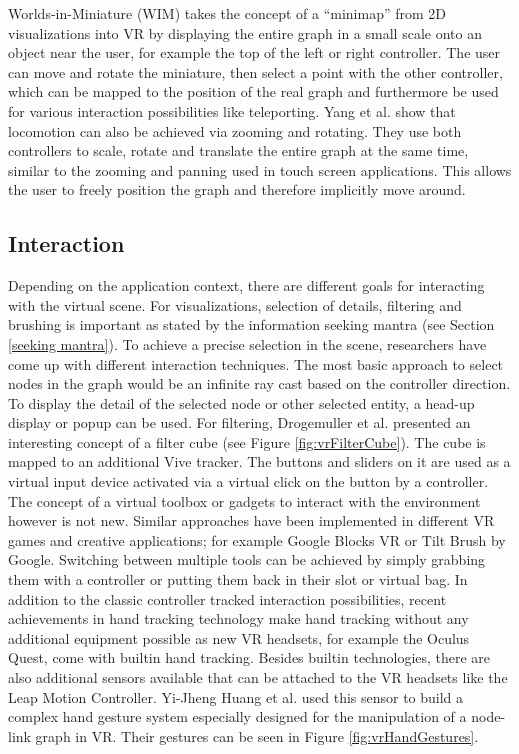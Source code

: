 Worlds-in-Miniature (WIM) \cite{drogemuller_examining_2020} takes the concept of a “minimap” from 2D visualizations into VR by displaying the entire graph in a small scale onto an object near the user, for example the top of the left or right controller. The user can move and rotate the miniature, then select a point with the other controller, which can be mapped to the position of the real graph and furthermore be used for various interaction possibilities like teleporting. Yang et al. \cite{yang_embodied_2020} show that locomotion can also be achieved via zooming and rotating. They use both controllers to scale, rotate and translate the entire graph at the same time, similar to the zooming and panning used in touch screen applications. This allows the user to freely position the graph and therefore implicitly move around.

\subsection{Interaction}
\label{chap:rw-vrinteraction}
Depending on the application context, there are different goals for interacting with the virtual scene. For visualizations, selection of details, filtering and brushing is important as stated by the information seeking mantra (see Section \ref{seeking mantra}). To achieve a precise selection in the scene, researchers have come up with different interaction techniques. The most basic approach to select nodes in the graph would be an infinite ray cast based on the controller direction. To display the detail of the selected node or other selected entity, a head-up display or popup can be used. 
For filtering, Drogemuller et al. \cite{drogemuller_vrige_2017} presented an interesting concept of a filter cube (see Figure \ref{fig:vrFilterCube}). The cube is mapped to an additional Vive tracker. The buttons and sliders on it are used as a virtual input device activated via a virtual click on the button by a controller. 
The concept of a virtual toolbox or gadgets to interact with the environment however is not new. Similar approaches have been implemented in different VR games and creative applications; for example Google Blocks VR or Tilt Brush by Google. Switching between multiple tools can be achieved by simply grabbing them with a controller or putting them back in their slot or virtual bag.
In addition to the classic controller tracked interaction possibilities, recent achievements in hand tracking technology make hand tracking without any additional equipment possible as new VR headsets, for example the Oculus Quest, come with builtin hand tracking. Besides builtin technologies, there are also additional sensors available that can be attached to the VR headsets like the Leap Motion Controller. Yi-Jheng Huang et al. \cite{yi-jheng_huang_gesture_2017} used this sensor to build a complex hand gesture system especially designed for the manipulation of a node-link graph in VR. Their gestures can be seen in Figure \ref{fig:vrHandGestures}. 

